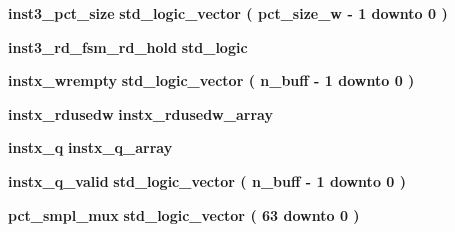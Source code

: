 \begin{DoxyCompactItemize}
\item 
{\bf inst3\+\_\+pct\+\_\+size} {\bfseries \textcolor{comment}{std\+\_\+logic\+\_\+vector}\textcolor{vhdlchar}{ }\textcolor{vhdlchar}{(}\textcolor{vhdlchar}{ }\textcolor{vhdlchar}{ }\textcolor{vhdlchar}{ }\textcolor{vhdlchar}{ }{\bfseries {\bf pct\+\_\+size\+\_\+w}} \textcolor{vhdlchar}{-\/}\textcolor{vhdlchar}{ } \textcolor{vhdldigit}{1} \textcolor{vhdlchar}{ }\textcolor{keywordflow}{downto}\textcolor{vhdlchar}{ }\textcolor{vhdlchar}{ } \textcolor{vhdldigit}{0} \textcolor{vhdlchar}{ }\textcolor{vhdlchar}{)}\textcolor{vhdlchar}{ }} 
\item 
{\bf inst3\+\_\+rd\+\_\+fsm\+\_\+rd\+\_\+hold} {\bfseries \textcolor{comment}{std\+\_\+logic}\textcolor{vhdlchar}{ }} 
\item 
{\bf instx\+\_\+wrempty} {\bfseries \textcolor{comment}{std\+\_\+logic\+\_\+vector}\textcolor{vhdlchar}{ }\textcolor{vhdlchar}{(}\textcolor{vhdlchar}{ }\textcolor{vhdlchar}{ }\textcolor{vhdlchar}{ }\textcolor{vhdlchar}{ }{\bfseries {\bf n\+\_\+buff}} \textcolor{vhdlchar}{-\/}\textcolor{vhdlchar}{ } \textcolor{vhdldigit}{1} \textcolor{vhdlchar}{ }\textcolor{keywordflow}{downto}\textcolor{vhdlchar}{ }\textcolor{vhdlchar}{ } \textcolor{vhdldigit}{0} \textcolor{vhdlchar}{ }\textcolor{vhdlchar}{)}\textcolor{vhdlchar}{ }} 
\item 
{\bf instx\+\_\+rdusedw} {\bfseries {\bfseries {\bf instx\+\_\+rdusedw\+\_\+array}} \textcolor{vhdlchar}{ }} 
\item 
{\bf instx\+\_\+q} {\bfseries {\bfseries {\bf instx\+\_\+q\+\_\+array}} \textcolor{vhdlchar}{ }} 
\item 
{\bf instx\+\_\+q\+\_\+valid} {\bfseries \textcolor{comment}{std\+\_\+logic\+\_\+vector}\textcolor{vhdlchar}{ }\textcolor{vhdlchar}{(}\textcolor{vhdlchar}{ }\textcolor{vhdlchar}{ }\textcolor{vhdlchar}{ }\textcolor{vhdlchar}{ }{\bfseries {\bf n\+\_\+buff}} \textcolor{vhdlchar}{-\/}\textcolor{vhdlchar}{ } \textcolor{vhdldigit}{1} \textcolor{vhdlchar}{ }\textcolor{keywordflow}{downto}\textcolor{vhdlchar}{ }\textcolor{vhdlchar}{ } \textcolor{vhdldigit}{0} \textcolor{vhdlchar}{ }\textcolor{vhdlchar}{)}\textcolor{vhdlchar}{ }} 
\item 
{\bf pct\+\_\+smpl\+\_\+mux} {\bfseries \textcolor{comment}{std\+\_\+logic\+\_\+vector}\textcolor{vhdlchar}{ }\textcolor{vhdlchar}{(}\textcolor{vhdlchar}{ }\textcolor{vhdlchar}{ } \textcolor{vhdldigit}{63} \textcolor{vhdlchar}{ }\textcolor{keywordflow}{downto}\textcolor{vhdlchar}{ }\textcolor{vhdlchar}{ } \textcolor{vhdldigit}{0} \textcolor{vhdlchar}{ }\textcolor{vhdlchar}{)}\textcolor{vhdlchar}{ }} 

\end{DoxyCompactItemize}
